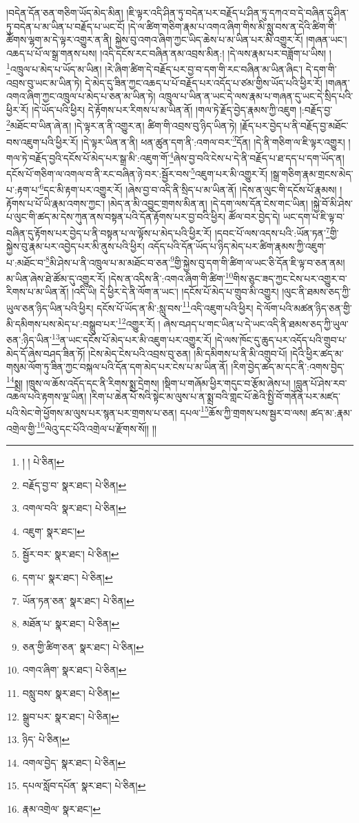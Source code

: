 །བདེན་དོན་ཅན་གཅིག་ཡོད་མེད་མིན། །ཇི་ལྟར་འདི་ཤིན་ཏུ་བདེན་པར་བརྗོད་པ་ཤིན་ཏུ་དཀའ་བ་དེ་བཞིན་དུ་ཤིན་ཏུ་བདེན་པ་མ་ཡིན་པ་བརྗོད་པ་ཡང་ངོ། །དེ་ལ་ཚིག་གཅིག་རྣམ་པ་འགའ་ཞིག་གིས་མི་སླུ་བས་ན་དེའི་ཚིག་གི་ཚོགས་ལྷག་མ་དེ་ལྟར་འགྱུར་ན་ནི། སྐྱེས་བུ་འགའ་ཞིག་ཀྱང་ཡིད་ཆེས་པ་མ་ཡིན་པར་མི་འགྱུར་རོ། །གཞན་ཡང་། འཆད་པ་པོ་ལ་སྒྲ་གནས་པས། །འདི་དངོས་རང་བཞིན་ནམ་འབྲས་མིན:། །དེ་ལས་རྣམ་པར་བཟློག་པ་ཡིས། །\footnote{། །  པེ་ཅིན། }འཁྲུལ་པ་མེད་པ་ཡོད་མ་ཡིན། །རེ་ཞིག་ཚིག་དེ་བརྗོད་པར་བྱ་བ་དག་གི་རང་བཞིན་མ་ཡིན་ཞིང་། དེ་དག་གི་འབྲས་བུ་ཡང་མ་ཡིན་ཏེ། དེ་མེད་དུ་ཟིན་ཀྱང་འཆད་པ་པོ་བརྗོད་པར་འདོད་པ་ཙམ་གྱིས་ཡོད་པའི་ཕྱིར་རོ། །གཞན་འགའ་ཞིག་ཀྱང་འཁྲུལ་པ་མེད་པ་ཅན་མ་ཡིན་ཏེ། འཁྲུལ་པ་ཡིན་ན་ཡང་དེ་ལས་རྣམ་པ་གཞན་དུ་ཡང་དེ་སྲིད་པའི་ཕྱིར་རོ། །དེ་ཡོད་པའི་ཕྱིར། དེ་རྟོགས་པར་རིགས་པ་མ་ཡིན་ནོ། །གལ་ཏེ་རྗོད་བྱེད་རྣམས་ཀྱི་འཇུག །:བརྗོད་བྱ་\footnote{བརྗོད་བྱ་བ་  སྣར་ཐང་།  པེ་ཅིན། }མཐོང་བ་ཡིན་ཞེ་ན། །དེ་ལྟར་ན་ནི་འགྱུར་ན། ཚིག་གི་འབྲས་བུ་ཉིད་ཡིན་ཏེ། །རྗོད་པར་བྱེད་པ་ནི་བརྗོད་བྱ་མཐོང་བས་འཇུག་པའི་ཕྱིར་རོ། །དེ་ལྟར་ཡིན་ན་ནི། ཕན་ཚུན་དག་ནི་:འགལ་བར་\footnote{འགལ་བའི་  སྣར་ཐང་།  པེ་ཅིན། }དོན། །དེ་ནི་གཅིག་ལ་ཇི་ལྟར་འགྱུར། །གལ་ཏེ་བརྗོད་བྱའི་དངོས་པོ་མེད་པར་སྒྲ་མི་:འཇུག་གོ་\footnote{འཇུག་  སྣར་ཐང་། }ཞེས་བྱ་བའི་ངེས་པ་དེ་ནི་བརྗོད་པ་ཐ་དད་པ་དག་ཡོད་ན། དངོས་པོ་གཅིག་ལ་འགལ་བ་ནི་རང་བཞིན་ཉེ་བར་:སྦྱོར་བས་\footnote{སྦྱོར་བར་  སྣར་ཐང་།  པེ་ཅིན། }འཇུག་པར་མི་འགྱུར་རོ། །སྒྲ་གཅིག་རྣམ་གྲངས་མེད་པ་:རྟག་པ་\footnote{དག་པ་  སྣར་ཐང་།  པེ་ཅིན། }དང་མི་རྟག་པར་འགྱུར་རོ། །ཞེས་བྱ་བ་འདི་ནི་སྲིད་པ་མ་ཡིན་ནོ། །དེས་ན་ལུང་གི་དངོས་པོ་རྣམས། །རྟོགས་པ་པོ་ཡི་རྣམ་འགས་ཀྱང་། །མེད་ན་མི་འབྱུང་གྲགས་མིན་ན། །དེ་དག་ལས་དོན་ངེས་གང་ཡིན། །སྐྱེ་བོ་མི་ཤེས་པ་ལུང་གི་ཚད་མ་དེས་ཀུན་ནས་བསྟན་པའི་དོན་རྟོགས་པར་བྱ་བའི་ཕྱིར། ཚོལ་བར་བྱེད་དེ། ཡང་དག་པ་ཇི་ལྟ་བ་བཞིན་དུ་རྟོགས་པར་བྱེད་པ་ནི་བསྟན་པ་ལ་ལྟོས་པ་མེད་པའི་ཕྱིར་རོ། །དབང་པོ་ལས་འདས་པའི་:ཡོན་ཏན་\footnote{ཡོན་ཏན་ཅན་  སྣར་ཐང་།  པེ་ཅིན། }གྱི་སྐྱེས་བུ་རྣམ་པར་འབྱེད་པར་མི་ནུས་པའི་ཕྱིར། འདོད་པའི་དོན་ཡོད་པ་ཉིད་མེད་པར་ཚིག་རྣམས་ཀྱི་འཇུག་པ་:མཐོང་བ་\footnote{མཐོན་པ་  སྣར་ཐང་།  པེ་ཅིན། }མི་ཤེས་པ་ནི་འཁྲུལ་པ་མ་མཐོང་བ་ཅན་\footnote{ཅན་གྱི་ཚིག་ཅན་  སྣར་ཐང་།  པེ་ཅིན། }གྱི་སྐྱེས་བུ་དག་གི་ཚིག་ལ་ཡང་ཅི་དོན་ཇི་ལྟ་བ་ཅན་ནམ། མ་ཡིན་ཞེས་ཐེ་ཚོམ་དུ་འགྱུར་རོ། །དེས་ན་འདིས་ནི་:འགའ་ཞིག་གི་ཚིག་\footnote{འགའ་ཞིག་  སྣར་ཐང་།  པེ་ཅིན། }གིས་ཅུང་ཟད་ཀྱང་ངེས་པར་འགྱུར་བ་རིགས་པ་མ་ཡིན་ནོ། །འདི་ཡི། དེ་ཕྱིར་དེ་ནི་ལོག་ན་ཡང་། །དངོས་པོ་མེད་པ་གྲུབ་མི་འགྱུར། །ལུང་ནི་ཐམས་ཅད་ཀྱི་ཡུལ་ཅན་ཉིད་ཡིན་པའི་ཕྱིར། དངོས་པོ་ཡོད་ན་མི་:སླུ་བས་\footnote{བསླུ་བས་  སྣར་ཐང་།  པེ་ཅིན། }འདི་འཇུག་པའི་ཕྱིར། དེ་ལོག་པའི་མཚན་ཉིད་ཅན་གྱི་མི་དམིགས་པས་མེད་པ་:བསྒྲུབ་པར་\footnote{སྒྲུབ་པར་  སྣར་ཐང་།  པེ་ཅིན། }འགྱུར་རོ། །
ཞེས་བཤད་པ་གང་ཡིན་པ་དེ་ཡང་འདི་ནི་ཐམས་ཅད་ཀྱི་ཡུལ་ཅན་:ཉིད་ཡིན་\footnote{ཉིད་  པེ་ཅིན། }ན་ཡང་དངོས་པོ་མེད་པར་མི་འཇུག་པར་འགྱུར་རོ། །དེ་ལས་ཁོང་དུ་ཆུད་པར་འདོད་པའི་གྲུབ་པ་མེད་དོ་ཞེས་བཤད་ཟིན་ཏོ། །ངེས་མེད་ངེས་པའི་འབྲས་བུ་ཅན། །མི་དམིགས་པ་ནི་མི་འགྲུབ་པོ། །དེའི་ཕྱིར་ཚད་མ་གསུམ་ལོག་ཏུ་ཟིན་ཀྱང་བསྐལ་པའི་དོན་དག་མེད་པར་ངེས་པ་མ་ཡིན་ནོ། །རིག་བྱེད་ཚད་མ་དང་ནི་:འགས་བྱེད་\footnote{འགལ་བྱེད་  སྣར་ཐང་།  པེ་ཅིན། }སྨྲ། །ཁྲུས་ལ་ཆོས་འདོད་དང་ནི་རིགས་སྨྲ་དྲེགས། །སྡིག་པ་གཞོམ་ཕྱིར་གདུང་བ་རྩོམ་ཞེས་པ། །བླུན་པོ་ཤེས་རབ་འཆལ་པའི་རྟགས་ལྔ་ཡིན། །རིག་པ་ཆེན་པོ་སའི་སྟེང་མ་ལུས་པ་ན་སྨྲ་བའི་གླང་པོ་ཆེའི་སྤྱི་བོ་གནོན་པར་མཛད་པའི་སེང་གེ་ཕྱོགས་མ་ལུས་པར་སྙན་པར་གྲགས་པ་ཅན། དཔལ་\footnote{དཔལ་སློབ་དཔོན་  སྣར་ཐང་།  པེ་ཅིན། }ཆོས་ཀྱི་གྲགས་པས་སྦྱར་བ་ལས། ཚད་མ་:རྣམ་འགྲེལ་གྱི་\footnote{རྣམ་འགྲེལ་  སྣར་ཐང་། }ལེའུ་དང་པོའི་འགྲེལ་པ་རྫོགས་སོ།། །།